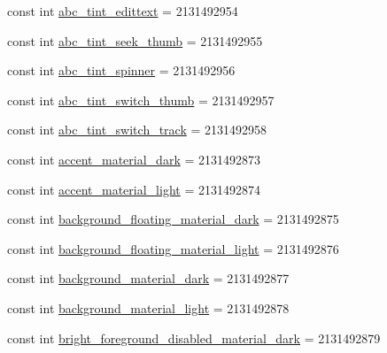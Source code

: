 \begin{DoxyCompactItemize}
\item 
const int \mbox{\hyperlink{class_f_w_p_s___app_1_1_droid_1_1_resource_1_1_color_a02aef9eea6cc4658212020a9d6d23b3d}{abc\+\_\+tint\+\_\+edittext}} = 2131492954
\item 
const int \mbox{\hyperlink{class_f_w_p_s___app_1_1_droid_1_1_resource_1_1_color_af7bee4b1382ed29b250b4f922b6a0f94}{abc\+\_\+tint\+\_\+seek\+\_\+thumb}} = 2131492955
\item 
const int \mbox{\hyperlink{class_f_w_p_s___app_1_1_droid_1_1_resource_1_1_color_a5d98abdece7bf63a6d209c555443d123}{abc\+\_\+tint\+\_\+spinner}} = 2131492956
\item 
const int \mbox{\hyperlink{class_f_w_p_s___app_1_1_droid_1_1_resource_1_1_color_a3c1ad35a7f427756ac56b2ec337b6838}{abc\+\_\+tint\+\_\+switch\+\_\+thumb}} = 2131492957
\item 
const int \mbox{\hyperlink{class_f_w_p_s___app_1_1_droid_1_1_resource_1_1_color_a5a83df73a5dd76b7cdaf6a0dfb68cd03}{abc\+\_\+tint\+\_\+switch\+\_\+track}} = 2131492958
\item 
const int \mbox{\hyperlink{class_f_w_p_s___app_1_1_droid_1_1_resource_1_1_color_a2e66f2028228ed86f306170af39b65cc}{accent\+\_\+material\+\_\+dark}} = 2131492873
\item 
const int \mbox{\hyperlink{class_f_w_p_s___app_1_1_droid_1_1_resource_1_1_color_a95eed1c366c6b9d4adde1e0ee2132402}{accent\+\_\+material\+\_\+light}} = 2131492874
\item 
const int \mbox{\hyperlink{class_f_w_p_s___app_1_1_droid_1_1_resource_1_1_color_ace41e849c63268d6dc701db1ea5f695c}{background\+\_\+floating\+\_\+material\+\_\+dark}} = 2131492875
\item 
const int \mbox{\hyperlink{class_f_w_p_s___app_1_1_droid_1_1_resource_1_1_color_afdcdcb150549d1fff0bb7db17d1c2fea}{background\+\_\+floating\+\_\+material\+\_\+light}} = 2131492876
\item 
const int \mbox{\hyperlink{class_f_w_p_s___app_1_1_droid_1_1_resource_1_1_color_a151b401928793588b161d1f3f5a22e43}{background\+\_\+material\+\_\+dark}} = 2131492877
\item 
const int \mbox{\hyperlink{class_f_w_p_s___app_1_1_droid_1_1_resource_1_1_color_a199af89b85e328d0b6a69bd0e841b9c8}{background\+\_\+material\+\_\+light}} = 2131492878
\item 
const int \mbox{\hyperlink{class_f_w_p_s___app_1_1_droid_1_1_resource_1_1_color_a8f6e8ac1632328a63ba6bca0361cc4e5}{bright\+\_\+foreground\+\_\+disabled\+\_\+material\+\_\+dark}} = 2131492879
\item 

\end{DoxyCompactItemize}
